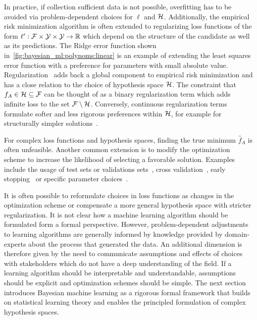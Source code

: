 In practice, if collection sufficient data is not possible, overfitting has to be avoided via problem-dependent choices for $\ell$ and $\mathcal{H}$.
Additionally, the empirical risk minimization algorithm is often extended to regularizing loss functions of the form $\ell^\prime : \mathcal{F} \times \mathcal{Y} \times \mathcal{Y} \to \mathbb{R}$ which depend on the structure of the candidate as well as its predictions.
The Ridge error function shown in~\cref{fig:bayesian_ml:polynoms:linear} is an example of extending the least squares error function with a preference for parameters with small absolute value.
Regularization~\parencite{oates_modern_2019} adds back a global component to empirical risk minimization and has a close relation to the choice of hypothesis space $\mathcal{H}$.
The constraint that $f_A \in \mathcal{H} \subseteq \mathcal{F}$ can be thought of as a binary regularization term which adds infinite loss to the set $\mathcal{F} \setminus \mathcal{H}$.
Conversely, continuous regularization terms formulate softer and less rigorous preferences within $\mathcal{H}$, for example for structurally simpler solutions~\parencite{bishop_christoph_pattern_2007,thorburn_occams_1915}.

For complex loss functions and hypothesis spaces, finding the true minimum $\hat{f}_A$ is often unfeasible.
Another common extension is to modify the optimization scheme to increase the likelihood of selecting a favorable solution.
Examples include the usage of test sets or validations sets~\parencite{bishop_christoph_pattern_2007}, cross validation~\parencite{stone_cross-validatory_1974}, early stopping~\parencite{morgan_generalization_1990} or specific parameter choices~\parencite{daniely_toward_2016}.

It is often possible to reformulate choices in loss functions as changes in the optimization scheme or compensate a more general hypothesis space with stricter regularization.
It is not clear how a machine learning algorithm should be formulated form a formal perspective.
However, problem-dependent adjustments to learning algorithms are generally informed by knowledge provided by domain-experts about the process that generated the data.
An additional dimension is therefore given by the need to communicate assumptions and effects of choices with stakeholders which do not have a deep understanding of the field.
If a learning algorithm should be interpretable and understandable, assumptions should be explicit and optimization schemes should be simple.
The next section introduces Bayesian machine learning as a rigorous formal framework that builds on statistical learning theory and enables the principled formulation of complex hypothesis spaces.

